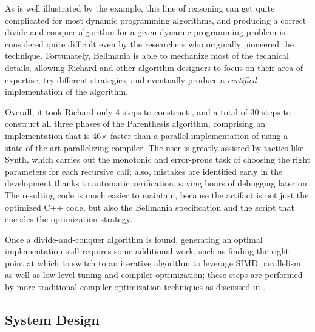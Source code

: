 As is well illustrated by the example, this line of reasoning can get quite complicated for most dynamic programming algorithms, 
and producing a correct divide-and-conquer algorithm for a given dynamic programming problem is considered quite difficult even by the researchers who originally pioneered the technique. 
Fortunately, Bellmania is able to mechanize most of the technical details,
allowing Richard and other algorithm designers to focus on their area of expertise,
try different strategies,
and eventually produce a \emph{certified} implementation of the algorithm.

Overall, it took Richard only 4 steps to construct ,
and a total of 30 steps to construct all three phases of the Parenthesis algorithm,
comprising an implementation that is 46$\times$ faster than a parallel implementation of
 using a state-of-the-art parallelizing compiler.
The user is greatly assisted by tactics like {\sf Synth}, which carries out the monotonic
and error-prone task of choosing the right parameters for each recursive call; also,
mistakes are identified early in the development thanks to automatic verification,
saving hours of debugging later on.
The resulting code is much easier to maintain, because the artifact is not just
the optimized C++ code, but also the Bellmania specification and the script
that encodes the optimization strategy.

Once a divide-and-conquer algorithm is found, generating an optimal implementation still requires some additional work, such as finding the right point at which to switch to an iterative algorithm to leverage SIMD parallelism as well as low-level tuning and compiler optimization;
these steps are performed by more traditional compiler optimization techniques
as discussed in .


\subsection{System Design}

